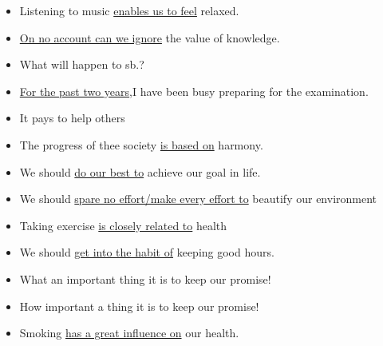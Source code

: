 \begin{itemize}
    \item Listening to music \uline{enables us to feel} relaxed.
    \item \uline{On no account can we ignore} the value of knowledge.
    \item What will happen to sb.? 
    \item \uline{For the past two years},I have been busy preparing for the examination.
    \item It pays to help others
    \item The progress of thee society \uline{is based on} harmony.
    \item We should \uline{do our best to} achieve our goal in life.
    \item We should \uline{spare no effort/make every effort to} beautify our environment
    \item Taking exercise \uline{is closely related to} health
    \item We should \uline{get into the habit of} keeping good hours.
    \item What an important thing it is to keep our promise!
    \item How important a thing it is to keep our promise!
    \item Smoking \uline{has a great influence on} our health.
\end{itemize}